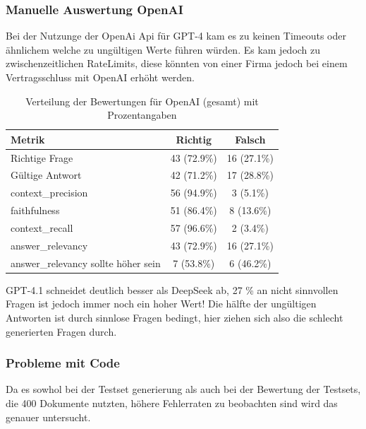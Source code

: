 \subsubsection{Manuelle Auswertung OpenAI}
Bei der Nutzunge der OpenAi Api für GPT-4 kam es zu keinen Timeouts oder ähnlichem welche zu ungültigen Werte führen würden. Es kam jedoch zu zwischenzeitlichen RateLimits, diese könnten von einer Firma jedoch bei einem Vertragsschluss mit OpenAI erhöht werden.

\begin{table}[h!]
    \centering
    \begin{tabular}{|l|c|c|}
    \hline
    \textbf{Metrik} & \textbf{Richtig} & \textbf{Falsch} \\
    \hline
    Richtige Frage                        & 43 (72.9\%) & 16 (27.1\%) \\
    Gültige Antwort                       & 42 (71.2\%) & 17 (28.8\%) \\
    context\_precision                    & 56 (94.9\%) & 3 (5.1\%) \\
    faithfulness                          & 51 (86.4\%) & 8 (13.6\%) \\
    context\_recall                       & 57 (96.6\%) & 2 (3.4\%) \\
    answer\_relevancy                     & 43 (72.9\%) & 16 (27.1\%) \\
    answer\_relevancy sollte höher sein  & 7 (53.8\%)  & 6 (46.2\%) \\
    \hline
    \end{tabular}
    \caption{Verteilung der Bewertungen für OpenAI (gesamt) mit Prozentangaben}
\end{table}

GPT-4.1 schneidet deutlich besser als DeepSeek ab, 27 \% an nicht sinnvollen Fragen ist jedoch immer noch ein hoher Wert!
Die hälfte der ungültigen Antworten ist durch sinnlose Fragen bedingt, hier ziehen sich also die schlecht generierten Fragen durch.


\subsubsection{Probleme mit Code}
Da es sowhol bei der Testset generierung als auch bei der Bewertung der Testsets, die 400 Dokumente nutzten, höhere Fehlerraten zu beobachten sind wird das genauer untersucht.


